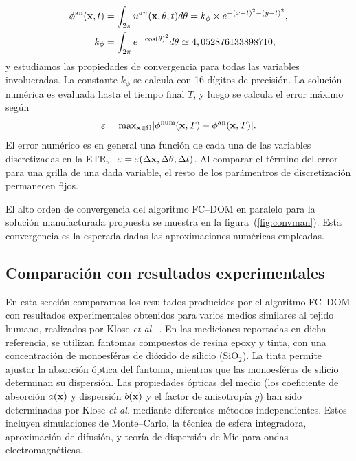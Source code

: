 \begin{equation*}
\begin{split}
\begin{aligned}
\phi^{\text{an}}(\mathbf{x},t)&=\int_{2\pi} u^{an}(\mathbf{x},\theta,t) d\theta=
k_{\phi}\times e^{-(x-t)^2-(y-t)^2},\\
k_{\phi}&=\int_{2\pi}e^{-\cos(\theta)^2}d\theta\simeq 4,052876133898710,
\end{aligned}
\end{split}
\label{eq:photondensityan}
\end{equation*}
y estudiamos las propiedades de convergencia 
para todas las variables involucradas. La constante 
$k_{\phi}$ se calcula con 16 dígitos de precisión. 
La solución numérica es evaluada hasta el tiempo final $T$, 
y luego se calcula el error máximo según
\begin{equation*}
\varepsilon=\text{max}_{\mathbf{x} \in \Omega} |\phi^{\text{num}}(\mathbf{x},T) -\phi^{\text{an}}(\mathbf{x},T)|.
\label{eq:maximumerror}
\end{equation*}
El error numérico es en general una función 
de cada una de las variables discretizadas en la ETR, 
\ie~$\varepsilon=\varepsilon(\Delta \mathbf{x}, \Delta \theta, \Delta t)$. 
Al comparar el término del error para una grilla de una dada variable, 
el resto de los parámentros de discretización permanecen fijos.

El alto orden de convergencia del algoritmo FC--DOM en paralelo 
para la solución manufacturada propuesta se muestra en la figura~(\ref{fig:convman}). 
Esta convergencia es la esperada dadas las aproximaciones 
numéricas empleadas.
\subsection{Comparación con resultados experimentales}
\label{sec:resexp}

En esta sección comparamos los resultados producidos por el algoritmo FC--DOM 
con resultados experimentales obtenidos para varios 
medios similares al tejido humano, realizados por Klose \textit{et al.}~\cite{Klose2002}. 
En las mediciones reportadas en dicha referencia, 
se utilizan fantomas compuestos de resina epoxy y tinta, 
con una concentración de monoesféras de dióxido de silicio ($\text{SiO}_2$). 
La tinta permite ajustar la absorción óptica del fantoma, 
mientras que las monoesféras de silicio determinan su dispersión. 
Las propiedades ópticas del medio (los coeficiente de absorción $a(\mathbf{x})$
y dispersión $b(\mathbf{x})$ y el 
factor de anisotropía $g$) han sido determinadas por Klose \textit{et al.} mediante 
diferentes métodos independientes. Estos incluyen simulaciones de Monte--Carlo, 
la técnica de esfera integradora, aproximación de difusión, y teoría de 
dispersión de Mie para ondas electromagnéticas. 

